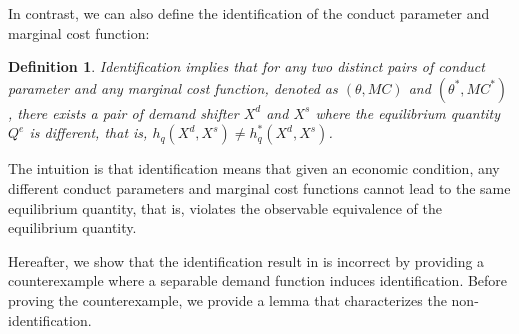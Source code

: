\documentclass[11pt, a4paper]{article}
\newtheorem{definition}{Definition}
\theoremstyle{remark}
\begin{document}
In contrast, we can also define the identification of the conduct parameter and marginal cost function:
\begin{definition}\label{def:identification}
    Identification implies that for any two distinct pairs of conduct parameter and any marginal cost function, denoted as $(\theta, MC)$ and $(\theta^{*}, MC^{*})$, there exists a pair of demand shifter $X^{d}$ and $X^{s}$ where the equilibrium quantity $Q^e$ is different, that is, $h_q(X^{d}, X^{s}) \ne h_q^{*}(X^{d}, X^{s})$.
\end{definition}
The intuition is that identification means that given an economic condition, any different conduct parameters and marginal cost functions cannot lead to the same equilibrium quantity, that is, violates the observable equivalence of the equilibrium quantity.


Hereafter, we show that the identification result in \citet{lau1982identifying} is incorrect by providing a counterexample where a separable demand function induces identification.
Before proving the counterexample, we provide a lemma that characterizes the non-identification.
\end{document}
